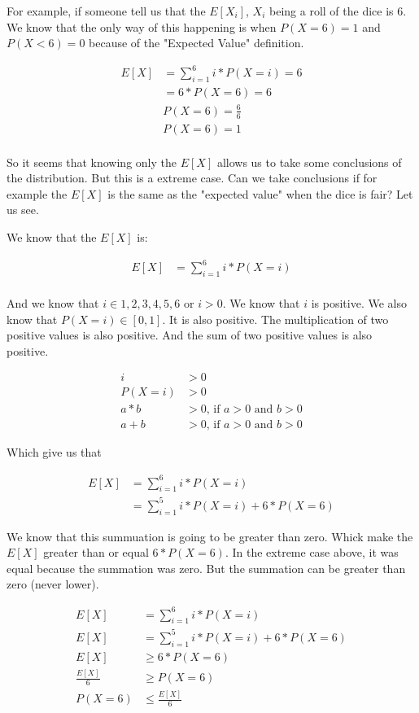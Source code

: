\documentclass[10pt,a4paper]{book}
\begin{document}
For example, if someone tell us that the $E[X_i]$, $X_i$ being a roll of the dice is $6$. We know that the only way of this happening is when $P(X = 6) = 1$ and $P(X < 6) = 0$ because of the "Expected Value" definition.

\begin{align*}
	E[X] &= \sum_{i=1}^{6}{i*P(X=i)} = 6\\
	&= 6*P(X=6) = 6\\
	& P(X=6) = \frac{6}{6}\\
	& P(X=6) = 1\\
\end{align*}

So it seems that knowing only the $E[X]$ allows us to take some conclusions of the distribution. But this is a extreme case. Can we take conclusions if for example the $E[X]$ is the same as the "expected value" when the dice is fair? Let us see.

We know that the $E[X]$ is:

\begin{align*}
	E[X] &= \sum_{i=1}^{6}{i*P(X=i)}\\
\end{align*}

And we know that $i \in {1,2,3,4,5,6}$ or $i > 0$. We know that $i$ is positive. We also know that $P(X = i) \in [0,1]$. It is also positive. The multiplication of two positive values is also positive. And the sum of two positive values is also positive.

\begin{align*}
	i &> 0\\
	P(X = i) &> 0\\
	a * b &> 0 \text{, if } a > 0 \text{ and } b > 0\\
	a + b &> 0 \text{, if } a > 0 \text{ and } b > 0	
\end{align*}

Which give us that 

\begin{align*}
	E[X] &= \sum_{i=1}^{6}{i*P(X=i)}\\
	&= \sum_{i=1}^{5}{i*P(X=i)} + 6*P(X=6)
\end{align*}

We know that this summuation is going to be greater than zero. Whick make the $E[X]$ greater than or equal $6*P(X=6)$. In the extreme case above, it was equal because the summation was zero. But the summation can be greater than zero (never lower).

\begin{align*}
	E[X] &= \sum_{i=1}^{6}{i*P(X=i)}\\
	E[X] &= \sum_{i=1}^{5}{i*P(X=i)} + 6*P(X=6)\\
	E[X] &\ge 6*P(X=6)\\
	\frac{E[X]}{6} &\ge P(X=6)\\
	P(X=6) &\le \frac{E[X]}{6}
\end{align*}
\end{document}

